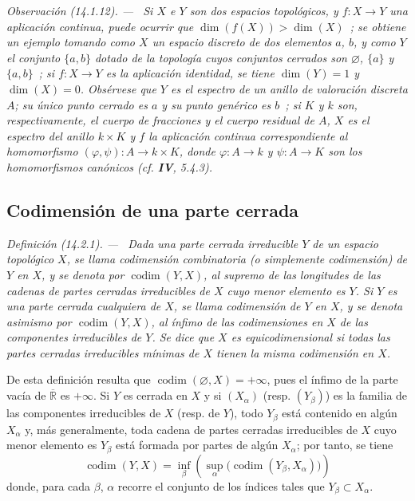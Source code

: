 \documentclass[10pt,oneside]{book}
\makeatletter
\newcommand{\setmanualcurrentlabel}[1]{\def\@currentlabel{#1}}
\newenvironment{definition}[1][]{%
  \setmanualcurrentlabel{#1}\par\medskip\noindent\itshape Definición (#1). ---\ }{\par}
\newenvironment{remark}[1][]{%
  \setmanualcurrentlabel{#1}\par\medskip\noindent\itshape Observación (#1). ---\ }{\par}
\makeatother
\begin{document}
\begin{remark}[14.1.12]
\label{0.14.1.12-es}
Si $X$ e $Y$ son dos espacios topológicos, y $f:X\to Y$ una aplicación
continua, puede ocurrir que $\dim(f(X))>\dim(X)$~; se obtiene un ejemplo tomando
como $X$ un espacio discreto de dos elementos $a$, $b$, y como $Y$ el conjunto
$\{a,b\}$ dotado de la topología cuyos conjuntos cerrados son
$\varnothing$, $\{a\}$ y $\{a,b\}$~; si $f:X\to Y$ es la aplicación
identidad, se tiene $\dim(Y)=1$ y $\dim(X)=0$. Obsérvese que $Y$ es el espectro
de un anillo de valoración discreta $A$; su único punto cerrado es $a$ y su
punto genérico es $b$~; si $K$ y $k$ son, respectivamente, el cuerpo de
fracciones y el cuerpo residual de $A$, $X$ es el espectro del anillo $k\times K$
y $f$ la aplicación continua correspondiente al homomorfismo
$(\varphi,\psi):A\to k\times K$, donde $\varphi:A\to k$ y $\psi:A\to K$ son
los homomorfismos canónicos (cf. \textbf{IV}, 5.4.3).
\end{remark}

\subsection{Codimensión de una parte cerrada}
\label{subsection:0.14.2-es}

\begin{definition}[14.2.1]
\label{0.14.2.1-es}
Dada una parte cerrada irreducible $Y$ de un espacio topológico $X$, se llama
codimensión combinatoria \textup{(o simplemente} codimensión) de $Y$ en
$X$, y se denota por $\operatorname{codim}(Y,X)$, al supremo de las longitudes
de las cadenas de partes cerradas irreducibles de $X$ cuyo menor elemento es
$Y$. Si $Y$ es una parte cerrada cualquiera de $X$, se llama
codimensión de $Y$ en $X$, y se denota asimismo por
$\operatorname{codim}(Y,X)$, al ínfimo de las codimensiones en $X$ de las
componentes irreducibles de $Y$. Se dice que $X$ es
equicodimensional si todas las partes cerradas irreducibles mínimas de
$X$ tienen la misma codimensión en $X$.
\end{definition}

De esta definición resulta que
$\operatorname{codim}(\varnothing,X)=+\infty$, pues el ínfimo de la parte vacía
de $\overline{\mathbb R}$ es $+\infty$. Si $Y$ es cerrada en $X$ y si
$(X_\alpha)$ (resp. $(Y_\beta)$) es la familia de las componentes irreducibles
de $X$ (resp. de $Y$), todo $Y_\beta$ está contenido en algún $X_\alpha$ y,
más generalmente, toda cadena de partes cerradas irreducibles de $X$ cuyo menor
elemento es $Y_\beta$ está formada por partes de algún $X_\alpha$; por tanto,
se tiene
\[
  \operatorname{codim}(Y,X)=
  \inf_\beta\left(\sup_\alpha
  \bigl(\operatorname{codim}(Y_\beta,X_\alpha)\bigr)\right)
  \tag{14.2.1.1}\label{0.14.2.1.1-es}
\]
donde, para cada $\beta$, $\alpha$ recorre el conjunto de los índices tales que
$Y_\beta\subset X_\alpha$.
\end{document}
